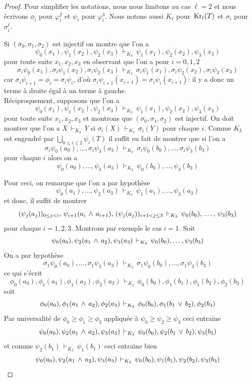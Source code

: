 \begin{proof}
 Pour simplifier les notations, nous nous limitons au cas
$\ell = 2$ et nous écrivons $\phi_i$ pour $\varphi^2_i$ et
$\psi_i$ pour $\varphi^3_i$. Nous notons aussi $K_\ell$ pour $\,{\rm Kr}_\ell(T)$
et $\sigma_i$ pour $\sigma_i^\ell$.


\noindent     Si $(\sigma_0,\sigma_1,\sigma_2)$ est injectif on montre que l'on a
$$
\psi_0(x_1),\psi_1(x_2),\psi_{2}(x_{3})\,\vdash_{K_3}\,
\psi_1(x_1),\psi_2(x_2),\psi_{3}(x_{3})
$$
pour toute suite $x_1,x_2,x_{3}$ en observant que l'on a
pour $i=0,1,2$
$$
\sigma_i\psi_0(x_1),\sigma_i\psi_1(x_2),\sigma_i\psi_{2}(x_{3})
\,\vdash_{K_2}\,
\sigma_i\psi_1(x_1),\sigma_i\psi_2(x_2),\sigma_i\psi_{3}(x_{3})
$$
car $\sigma_i\psi_{i+1} = \phi_i = \sigma_i\psi_{i}$, d'où $\sigma_i\psi_{i+1}(x_{i+1})  = \sigma_i\psi_{i}(x_{i+1})$: il y a donc un terme à droite égal à un terme à gauche.\\
Réciproquement, supposons que l'on a
$$
\psi_0(x_1),\psi_1(x_2),\psi_{2}(x_{3})
\,\vdash_{K_3}\,
\psi_1(x_1),\psi_2(x_2),\psi_{3}(x_{3})
$$
pour toute suite $x_1,x_2,x_{3}$ et montrons que
$(\sigma_0,\sigma_1,\sigma_{2})$ est injectif.
On doit montrer que l'on a $X\,\vdash_{K_3}\, Y$ si
$\sigma_i(X)\,\vdash_{K_2}\,\sigma_i(Y)$ pour chaque $i$.
Comme $K_3$ est engendré par $\bigcup_{0\leq i\leq 2} \psi_i(T)$
il suffit en fait de montrer que si l'on a
$$
\sigma_i\psi_0(a_0),\dots,\sigma_i\psi_{3}(a_{3})
\,\vdash_{K_2}\,
\sigma_i\psi_0(b_0),\dots,\sigma_i\psi_{3}(b_{3})
$$
pour chaque $i$ alors on a
$$
\psi_0(a_0),\dots,\psi_{3}(a_{3})
\,\vdash_{K_3}\,
\psi_0(b_0),\dots,\psi_{3}(b_{3})
$$

\noi Pour ceci, on remarque que l'on a par hypothèse
$$
\psi_0(a_1),\dots,\psi_{2}(a_{3})
\,\vdash_{K_3}\,
\psi_1(a_1),\dots,\psi_{3}(a_{3})
$$
et donc, il suffit de montrer
$$
(\psi_j(a_j))_{0\leq j<i},\,\psi_{i+1}(a_i\,\wedge\, a_{i+1}),\,
(\psi_j(a_j))_{i+1< j\leq 3}
\,\vdash_{K_3}\,
\psi_0(b_0),\,\dots,\,\psi_{3}(b_{3})
$$
pour chaque $i=1,2,3$. Montrons par exemple le cas $i=1$. Soit
$$
\psi_0(a_0),\psi_2(a_1\,\wedge\, a_2),\psi_3(a_3)\,\vdash_{K_3}\, 
\psi_0(b_0),\dots,\psi_{3}(b_{3})
$$
On a par hypothèse
$$
\sigma_1\psi_0(a_0),\dots,
\sigma_1\psi_{3}(a_{3})
\,\vdash_{K_2}\,
\sigma_1\psi_0(b_0),\dots,
\sigma_1\psi_{3}(b_{3})
$$
ce qui s'écrit
$$
\phi_0(a_0),\phi_1(a_1),\phi_1(a_2),\phi_2(a_3)
\,\vdash_{K_2}\,
\phi_0(b_0),\phi_1(b_1),\phi_1(b_2),\phi_2(b_3)
$$
soit
$$
\phi_0(a_0),\phi_1(a_1\,\wedge\, a_2),\phi_2(a_3)
\,\vdash_{K_2}\,
\phi_0(b_0),\phi_1(b_1\,\vee\, b_2),\phi_2(b_3)
$$
Par universalité de $\phi_0\geq \phi_1\geq \phi_2$ appliquée
à $\psi_0\geq\psi_2\geq\psi_3$ ceci entraine
$$
\psi_0(a_0),\psi_2(a_1\,\wedge\, a_2),\psi_3(a_3)
\,\vdash_{K_3}\,
\psi_0(b_0),\psi_2(b_1\,\vee\, b_2),\psi_3(b_3)
$$
et comme $\psi_2(b_1)\,\vdash_{K_3}\, \psi_1(b_1)$
ceci entraine bien
$$
\psi_0(a_0),\psi_2(a_1\,\wedge\, a_2),\psi_3(a_3)
\,\vdash_{K_3}\,
\psi_0(b_0),\psi_1(b_1),\psi_2(b_2),\psi_3(b_3)
$$
\end{proof}


